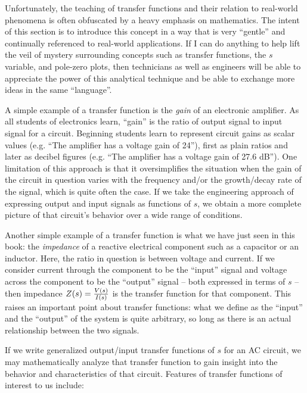 Unfortunately, the teaching of transfer functions and their relation to real-world phenomena is often obfuscated by a heavy emphasis on mathematics.  The intent of this section is to introduce this concept in a way that is very ``gentle'' and continually referenced to real-world applications.  If I can do anything to help lift the veil of mystery surrounding concepts such as transfer functions, the $s$ variable, and pole-zero plots, then technicians as well as engineers will be able to appreciate the power of this analytical technique and be able to exchange more ideas in the same ``language''.

\vskip 10pt

A simple example of a transfer function is the \textit{gain} of an electronic amplifier.  As all students of electronics learn, ``gain'' is the ratio of output signal to input signal for a circuit.  Beginning students learn to represent circuit gains as scalar values (e.g. ``The amplifier has a voltage gain of 24''), first as plain ratios and later as decibel figures (e.g. ``The amplifier has a voltage gain of 27.6 dB'').  One limitation of this approach is that it oversimplifies the situation when the gain of the circuit in question varies with the frequency and/or the growth/decay rate of the signal, which is quite often the case.  If we take the engineering approach of expressing output and input signals as functions of $s$, we obtain a more complete picture of that circuit's behavior over a wide range of conditions.

Another simple example of a transfer function is what we have just seen in this book: the \textit{impedance} of a reactive electrical component such as a capacitor or an inductor.  Here, the ratio in question is between voltage and current.  If we consider current through the component to be the ``input'' signal and voltage across the component to be the ``output'' signal -- both expressed in terms of $s$ -- then impedance $Z(s) = {V(s) \over I(s)}$ is the transfer function for that component.  This raises an important point about transfer functions: what we define as the ``input'' and the ``output'' of the system is quite arbitrary, so long as there is an actual relationship between the two signals.   

\vskip 10pt

If we write generalized output/input transfer functions of $s$ for an AC circuit, we may mathematically analyze that transfer function to gain insight into the behavior and characteristics of that circuit.  Features of transfer functions of interest to us include:

